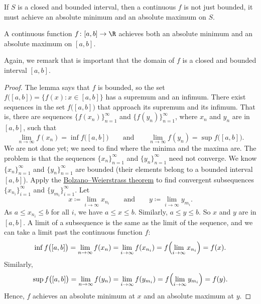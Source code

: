 If $S$ is a closed
and bounded interval, then a continuous $f$
is not just bounded, it must achieve an absolute minimum and an absolute
maximum on $S$.

\begin{thm}
%
%
%
A continuous function $f \colon [a,b] \to \R$
achieves both an absolute minimum and an absolute maximum on $[a,b]$.
\end{thm}

Again, we remark that is important that the domain of $f$ is a closed and bounded interval $[a,b]$.

\begin{proof}
The lemma says that $f$ is bounded, so
the set $f\bigl([a,b]\bigr) = \bigl\{ f(x) : x \in [a,b] \bigr\}$ has a supremum and an infimum.
There exist sequences
in the set $f\bigl([a,b]\bigr)$ that approach its supremum and its infimum.
That is, there are sequences
$\bigl\{ f(x_n) \bigr\}_{n=1}^\infty$ and $\bigl\{ f(y_n)
\bigr\}_{n=1}^\infty$, where $x_n$ and $y_n$ are in $[a,b]$,
such that
\begin{equation*}
\lim_{n\to\infty} f(x_n) = \inf f\bigl([a,b]\bigr) \qquad \text{and} \qquad
\lim_{n\to\infty} f(y_n) = \sup f\bigl([a,b]\bigr).
\end{equation*}
We are not done yet; we need to find where the minima and the maxima are.
The problem is that the sequences $\{ x_n \}_{n=1}^\infty$ and
$\{ y_n \}_{n=1}^\infty$ need not converge.
We know $\{ x_n \}_{n=1}^\infty$ and $\{ y_n \}_{n=1}^\infty$ are bounded
(their elements belong to a bounded interval $[a,b]$).
Apply the 
\hyperref[thm:bwseq]{Bolzano--Weierstrass theorem}
to find
convergent subsequences
$\{ x_{n_i} \}_{i=1}^\infty$ and 
$\{ y_{m_i} \}_{i=1}^\infty$.  Let
\begin{equation*}
x \coloneqq \lim_{i\to\infty} x_{n_i}
\qquad \text{and} \qquad
y \coloneqq \lim_{i\to\infty} y_{m_i}.
\end{equation*}
As $a \leq x_{n_i} \leq b$ for all $i$, we have $a \leq x \leq b$.
Similarly, $a \leq y \leq b$.  So $x$ and $y$ are in $[a,b]$.
A limit of a subsequence is the same as the limit of the
sequence, and we can take a limit past the continuous function $f$:
\begin{equation*}
\inf f\bigl([a,b]\bigr) = \lim_{n\to\infty} f(x_n)
= \lim_{i\to\infty} f(x_{n_i}) = 
f \Bigl( \lim_{i\to\infty} x_{n_i} \Bigr) = f(x) .
\end{equation*}
Similarly,
\begin{equation*}
\sup f\bigl([a,b]\bigr) = \lim_{n\to\infty} f(y_n)
= \lim_{i\to\infty} f(y_{m_i}) = 
f \Bigl( \lim_{i\to\infty} y_{m_i} \Bigr) = f(y) .
\end{equation*}
Hence, $f$ achieves an absolute minimum at $x$ and
an absolute maximum at $y$.
\end{proof}

